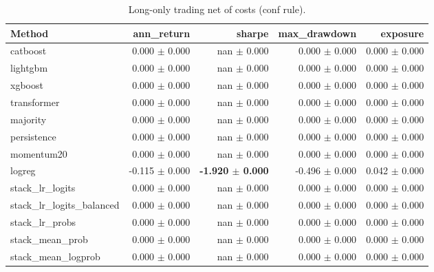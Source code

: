 \begin{table}[t]
\centering
\scriptsize
\caption{Long-only trading net of costs (conf rule).}
\label{tab:trading_conf}
\begin{tabular}{lrrrr}
\toprule
Method & ann\_return & sharpe & max\_drawdown & exposure \\
\midrule
catboost & 0.000 $\pm$ 0.000 & nan $\pm$ 0.000 & 0.000 $\pm$ 0.000 & 0.000 $\pm$ 0.000 \\
lightgbm & 0.000 $\pm$ 0.000 & nan $\pm$ 0.000 & 0.000 $\pm$ 0.000 & 0.000 $\pm$ 0.000 \\
xgboost & 0.000 $\pm$ 0.000 & nan $\pm$ 0.000 & 0.000 $\pm$ 0.000 & 0.000 $\pm$ 0.000 \\
transformer & 0.000 $\pm$ 0.000 & nan $\pm$ 0.000 & 0.000 $\pm$ 0.000 & 0.000 $\pm$ 0.000 \\
majority & 0.000 $\pm$ 0.000 & nan $\pm$ 0.000 & 0.000 $\pm$ 0.000 & 0.000 $\pm$ 0.000 \\
persistence & 0.000 $\pm$ 0.000 & nan $\pm$ 0.000 & 0.000 $\pm$ 0.000 & 0.000 $\pm$ 0.000 \\
momentum20 & 0.000 $\pm$ 0.000 & nan $\pm$ 0.000 & 0.000 $\pm$ 0.000 & 0.000 $\pm$ 0.000 \\
logreg & -0.115 $\pm$ 0.000 & \textbf{-1.920 $\pm$ 0.000} & -0.496 $\pm$ 0.000 & 0.042 $\pm$ 0.000 \\
stack\_lr\_logits & 0.000 $\pm$ 0.000 & nan $\pm$ 0.000 & 0.000 $\pm$ 0.000 & 0.000 $\pm$ 0.000 \\
stack\_lr\_logits\_balanced & 0.000 $\pm$ 0.000 & nan $\pm$ 0.000 & 0.000 $\pm$ 0.000 & 0.000 $\pm$ 0.000 \\
stack\_lr\_probs & 0.000 $\pm$ 0.000 & nan $\pm$ 0.000 & 0.000 $\pm$ 0.000 & 0.000 $\pm$ 0.000 \\
stack\_mean\_prob & 0.000 $\pm$ 0.000 & nan $\pm$ 0.000 & 0.000 $\pm$ 0.000 & 0.000 $\pm$ 0.000 \\
stack\_mean\_logprob & 0.000 $\pm$ 0.000 & nan $\pm$ 0.000 & 0.000 $\pm$ 0.000 & 0.000 $\pm$ 0.000 \\
\bottomrule
\end{tabular}
\end{table}